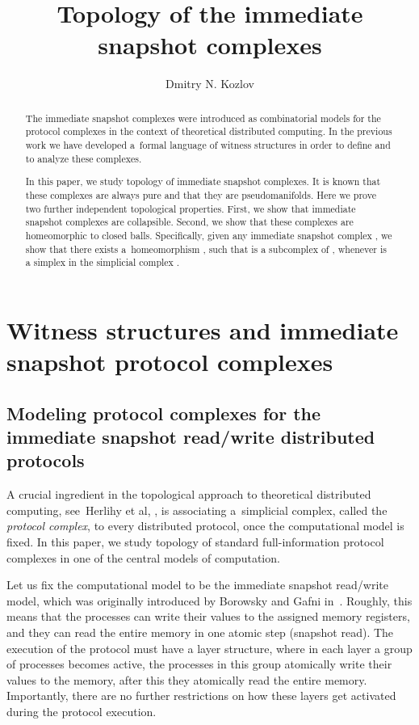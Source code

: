 \documentclass{amsart}[10pt]
\title {Topology of the immediate snapshot complexes}
\author{Dmitry N. Kozlov}
\numberwithin{equation}{section}
\numberwithin{figure}{section}
\numberwithin{table}{section}
\begin{document}
\begin{abstract}
The immediate snapshot complexes were introduced as combinatorial
models for the protocol complexes in the context of theoretical
distributed computing. In the previous work we have developed a~formal
language of witness structures in order to define and to analyze
these complexes.

In this paper, we study topology of immediate snapshot complexes. It
is known that these complexes are always pure and that they are
pseudomanifolds. Here we prove two further independent topological
properties. First, we show that immediate snapshot complexes are
collapsible. Second, we show that these complexes are homeomorphic to
closed balls. Specifically, given any immediate snapshot complex
, we show that there exists a~homeomorphism
, such that  is
a subcomplex of , whenever  is a simplex in the
simplicial complex .
\end{abstract}

\maketitle

\section{Witness structures and immediate snapshot protocol complexes}

\subsection{Modeling protocol complexes for the immediate snapshot 
read/write distributed protocols} 

\nin A crucial ingredient in the topological approach to theoretical
distributed computing, see~Herlihy et al, \cite{HKR}, is associating
a~simplicial complex, called the {\it protocol complex}, to every
distributed protocol, once the computational model is fixed. In this
paper, we study topology of standard full-information protocol
complexes in one of the central models of computation.

Let us fix the computational model to be the immediate snapshot
read/write model, which was originally introduced by Borowsky and
Gafni in~\cite{BG}. Roughly, this means that the processes can write
their values to the assigned memory registers, and they can read the
entire memory in one atomic step (snapshot read). The execution of the
protocol must have a layer structure, where in each layer a group of
processes becomes active, the processes in this group atomically write
their values to the memory, after this they atomically read the entire
memory.  Importantly, there are no further restrictions on how these
layers get activated during the protocol execution.
\end{document}
